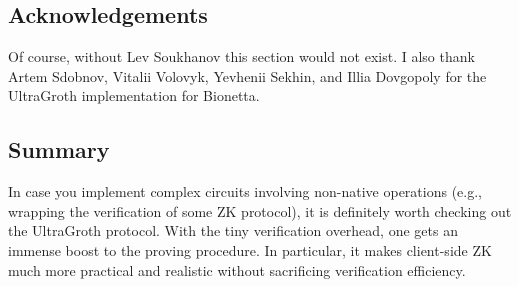 \subsection{Acknowledgements}

Of course, without Lev Soukhanov this section would not exist. I also thank
Artem Sdobnov, Vitalii Volovyk, Yevhenii Sekhin, and Illia Dovgopoly for the
UltraGroth implementation for Bionetta.

\subsection{Summary}

In case you implement complex circuits involving non-native operations (e.g.,
wrapping the verification of some ZK protocol), it is definitely worth checking
out the UltraGroth protocol. With the tiny verification overhead, one gets an
immense boost to the proving procedure. In particular, it makes client-side ZK
much more practical and realistic without sacrificing verification efficiency.
